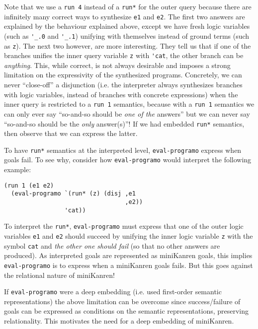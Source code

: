 Note that we use a \Verb|run 4| instead of a \Verb|run*| for the outer query
because there are infinitely many correct ways to synthesize \Verb|e1| and
\Verb|e2|. The first two answers are explained by the behaviour explained above,
except we have fresh logic variables (such as \Verb|'_.0| and \Verb|'_.1|)
unifying with themselves instead of ground terms (such as \Verb|z|). The next
two however, are more interesting. They tell us that if one of the branches
unifies the inner query variable \Verb|z| with \Verb|'cat|, the other branch can
be \textit{anything}. This, while correct, is not always desirable and imposes a
strong limitation on the expressivity of the synthesized programs.  Concretely,
we can never ``close-off'' a disjunction (i.e. the interpreter always
synthesizes branches with logic variables, instead of branches with concrete
expressions) when the inner query is restricted to a \Verb|run 1| semantics,
because with a \Verb|run 1| semantics we can only ever say ``so-and-so should be
\textit{one of the} answers'' but we can never say ``so-and-so should be the
\textit{only} answer(s)''!  If we had embedded \Verb|run*| semantics, then
observe that we can express the latter.

To have \Verb|run*| semantics at the interpreted level, \Verb|eval-programo|
express when goals fail. To see why, consider how \Verb|eval-programo| would
interpret the following example:
\begin{Verbatim}
(run 1 (e1 e2)
  (eval-programo `(run* (z) (disj ,e1
                                  ,e2))
                 'cat))
\end{Verbatim}

To interpret the \Verb|run*|, \Verb|eval-programo| must express that one of the
outer logic variables \Verb|e1| and \Verb|e2| should succeed by unifying the
inner logic variable \Verb|z| with the symbol \Verb|cat| and \textit{the other
one should fail} (so that no other answers are produced). As interpreted goals
are represented as miniKanren goals, this implies \Verb|eval-programo| is to
express when a miniKanren goals fails. But this goes against the relational
nature of miniKanren!

If \Verb|eval-programo| were a deep embedding (i.e. used first-order semantic
representations) the above limitation can be overcome since success/failure of
goals can be expressed as conditions on the semantic representations, preserving
relationality. This motivates the need for a deep embedding of miniKanren.

